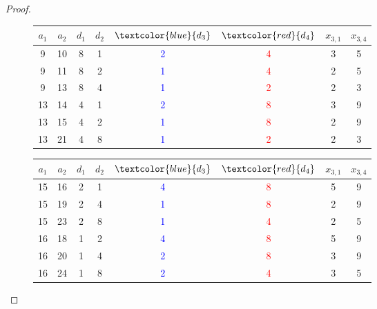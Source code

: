 \documentclass[10pt, reqno]{amsart}
\theoremstyle{definition}
\theoremstyle{plain}
\begin{document}
\begin{proof}
\begin{figure}[hbt!]
\centering
\renewcommand{\arraystretch}{1.5}
\begin{tabular}{|c|c|c|c|c|c|c|c|} \hline
  $a_1$ & $a_2$  & $d_1$ & $d_2$ & $\textcolor{blue}{d_3}$ & $\textcolor{red}{d_4}$ & $x_{3,1}$  & $x_{3,4}$\\  \hline
    9  &  10  & 8 & 1 & \textcolor{blue}{2} & \textcolor{red}{4} & 3  & 5 \\  \hline
     9 &  11  &  8 & 2 & \textcolor{blue}{1} & \textcolor{red}{4} & 2 & 5 \\  \hline
     9 &    13  & 8 & 4 & \textcolor{blue}{1} & \textcolor{red}{2} & 2 & 3  \\  \hline
     13  &  14  & 4 & 1 & \textcolor{blue}{2} & \textcolor{red}{8} & 3  & 9 \\  \hline
     13 &  15  &  4 & 2 & \textcolor{blue}{1} & \textcolor{red}{8} & 2 & 9 \\  \hline
     13 &    21  & 4 & 8 & \textcolor{blue}{1} & \textcolor{red}{2} & 2 & 3  \\  \hline
    \end{tabular}\hspace{0.15in}
\begin{tabular}{|c|c|c|c|c|c|c|c|} \hline
  $a_1$ & $a_2$  & $d_1$ & $d_2$ & $\textcolor{blue}{d_3}$ & $\textcolor{red}{d_4}$ & $x_{3,1}$  & $x_{3,4}$\\  \hline
    15  &  16  & 2 & 1 & \textcolor{blue}{4} & \textcolor{red}{8} & 5  & 9 \\  \hline
     15 &  19  &  2 & 4 & \textcolor{blue}{1} & \textcolor{red}{8} & 2 & 9 \\  \hline
     15 &   23  & 2 & 8 & \textcolor{blue}{1} & \textcolor{red}{4} & 2 & 5  \\  \hline
     16  &  18  & 1 & 2 & \textcolor{blue}{4} & \textcolor{red}{8} & 5  & 9 \\  \hline
     16 &  20  &  1 & 4 & \textcolor{blue}{2} & \textcolor{red}{8} & 3 & 9 \\  \hline
     16 &    24  & 1 & 8 & \textcolor{blue}{2} & \textcolor{red}{4} & 3 & 5  \\  \hline
    \end{tabular}


\end{figure}
\end{proof}
\end{document}
